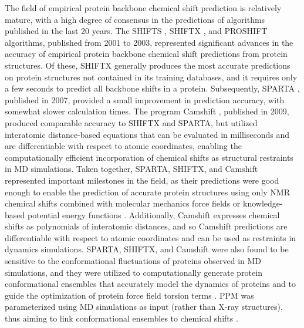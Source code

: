 \documentclass[9pt,review]{livecoms}
\begin{document}
The field of empirical protein backbone chemical shift prediction is relatively mature, with a high degree of consensus in the predictions of algorithms published in the last 20 years.
The SHIFTS \cite{xu_automated_2001}, SHIFTX \cite{neal_rapid_2003}, and PROSHIFT \cite{meiler_proshift_2003} algorithms, published from 2001 to 2003, represented significant advances in the accuracy of empirical protein backbone chemical shift predictions from protein structures.
Of these, SHIFTX generally produces the most accurate predictions on protein structures not contained in its training databases, and it requires only a few seconds to predict all backbone shifts in a protein.
Subsequently, SPARTA \cite{shen_protein_2007}, published in 2007, provided a small improvement in prediction accuracy, with somewhat slower calculation times.
The program Camshift \cite{kohlhoff_fast_2009}, published in 2009, produced comparable accuracy to SHIFTX and SPARTA, but utilized interatomic distance-based equations that can be evaluated in milliseconds and are differentiable with respect to atomic coordinates, enabling the computationally efficient incorporation of chemical shifts as structural restraints in MD simulations.
Taken together, SPARTA, SHIFTX, and Camshift represented important milestones in the field, as their predictions were good enough to enable the prediction of accurate protein structures using only NMR chemical shifts combined with molecular mechanics force fields or knowledge-based potential energy functions \cite{cavalli_protein_2007,shen_consistent_2008,wishart_cs23d_2008,robustelli_folding_2009,robustelli_using_2010}.
Additionally, Camshift expresses chemical shifts as polynomials of interatomic distances, and so Camshift predictions are differentiable with respect to atomic coordinates and can be used as restraints in dynamics simulations.
SPARTA, SHIFTX, and Camshift were also found to be sensitive to the conformational fluctuations of proteins observed in MD simulations, and they were utilized to computationally generate protein conformational ensembles that accurately model the dynamics of proteins \cite{li_certification_2010,markwick_enhanced_2010,robustelli_interpreting_2012,robustelli_conformational_2013} and to guide the optimization of protein force field torsion terms \cite{li_nmr-based_2010,robustelli_developing_2018}. PPM was parameterized using MD simulations as input (rather than X-ray structures), thus aiming to link conformational ensembles to chemical shifts \cite{li_ppm_2012}.
\end{document}
